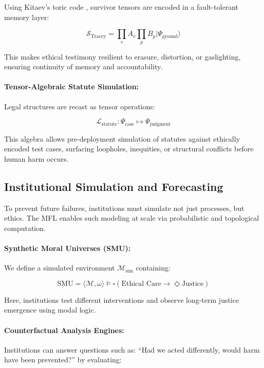 \documentclass{article}
\theoremstyle{plain}
\theoremstyle{claimstyle}
\begin{document}
Using Kitaev’s toric code \citep{Kitaev2003}, survivor tensors are encoded in a fault-tolerant memory layer:

\[
\mathcal{S}_{\text{Tracey}} = \prod_v A_v \prod_p B_p |\Psi_{\text{ground}}\rangle
\]

This makes ethical testimony resilient to erasure, distortion, or gaslighting, ensuring continuity of memory and accountability.

\paragraph{Tensor-Algebraic Statute Simulation:}

Legal structures are recast as tensor operations:

\[
\mathcal{L}_{\text{statute}}: \Psi_{\text{case}} \mapsto \Psi_{\text{judgment}}
\]

This algebra allows pre-deployment simulation of statutes against ethically encoded test cases, surfacing loopholes, inequities, or structural conflicts before human harm occurs.

\subsection{Institutional Simulation and Forecasting}

To prevent future failures, institutions must simulate not just processes, but ethics. The MFL enables such modeling at scale via probabilistic and topological computation.

\paragraph{Synthetic Moral Universes (SMU):}

We define a simulated environment \(\mathcal{M}_{\text{sim}}\) containing:

\[
\text{SMU} = \langle \mathcal{M}, \omega \rangle \models \square (\text{Ethical Care} \rightarrow \Diamond \text{Justice})
\]

Here, institutions test different interventions and observe long-term justice emergence using modal logic.

\paragraph{Counterfactual Analysis Engines:}

Institutions can answer questions such as: “Had we acted differently, would harm have been prevented?” by evaluating:
\end{document}
